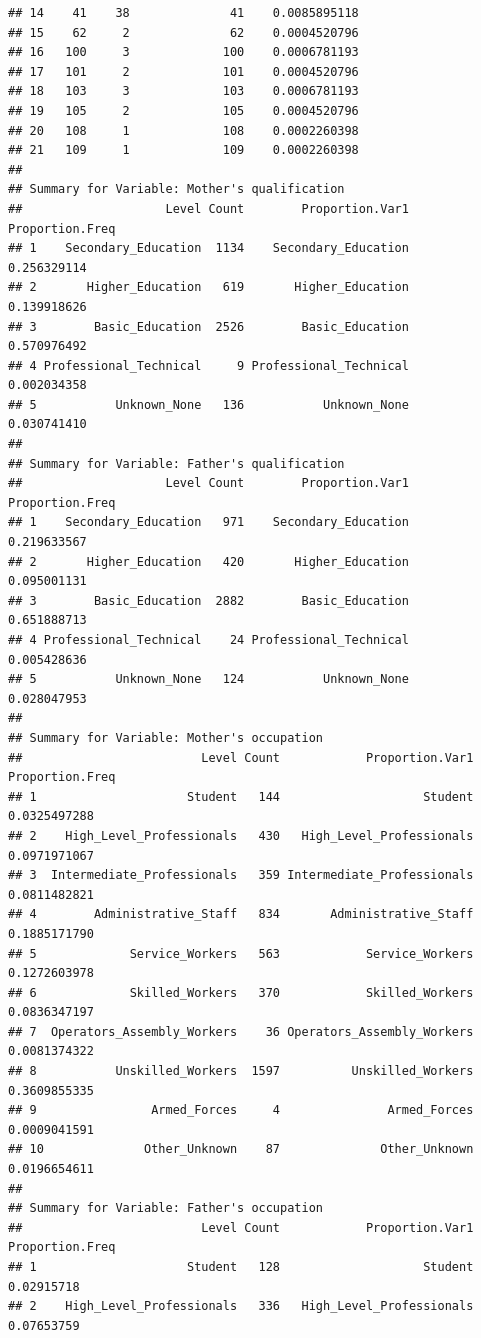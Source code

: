 \documentclass[
]{article}
\begin{document}
\begin{verbatim}
## 14    41    38              41    0.0085895118
## 15    62     2              62    0.0004520796
## 16   100     3             100    0.0006781193
## 17   101     2             101    0.0004520796
## 18   103     3             103    0.0006781193
## 19   105     2             105    0.0004520796
## 20   108     1             108    0.0002260398
## 21   109     1             109    0.0002260398
## 
## Summary for Variable: Mother's qualification 
##                    Level Count        Proportion.Var1 Proportion.Freq
## 1    Secondary_Education  1134    Secondary_Education     0.256329114
## 2       Higher_Education   619       Higher_Education     0.139918626
## 3        Basic_Education  2526        Basic_Education     0.570976492
## 4 Professional_Technical     9 Professional_Technical     0.002034358
## 5           Unknown_None   136           Unknown_None     0.030741410
## 
## Summary for Variable: Father's qualification 
##                    Level Count        Proportion.Var1 Proportion.Freq
## 1    Secondary_Education   971    Secondary_Education     0.219633567
## 2       Higher_Education   420       Higher_Education     0.095001131
## 3        Basic_Education  2882        Basic_Education     0.651888713
## 4 Professional_Technical    24 Professional_Technical     0.005428636
## 5           Unknown_None   124           Unknown_None     0.028047953
## 
## Summary for Variable: Mother's occupation 
##                         Level Count            Proportion.Var1 Proportion.Freq
## 1                     Student   144                    Student    0.0325497288
## 2    High_Level_Professionals   430   High_Level_Professionals    0.0971971067
## 3  Intermediate_Professionals   359 Intermediate_Professionals    0.0811482821
## 4        Administrative_Staff   834       Administrative_Staff    0.1885171790
## 5             Service_Workers   563            Service_Workers    0.1272603978
## 6             Skilled_Workers   370            Skilled_Workers    0.0836347197
## 7  Operators_Assembly_Workers    36 Operators_Assembly_Workers    0.0081374322
## 8           Unskilled_Workers  1597          Unskilled_Workers    0.3609855335
## 9                Armed_Forces     4               Armed_Forces    0.0009041591
## 10              Other_Unknown    87              Other_Unknown    0.0196654611
## 
## Summary for Variable: Father's occupation 
##                         Level Count            Proportion.Var1 Proportion.Freq
## 1                     Student   128                    Student      0.02915718
## 2    High_Level_Professionals   336   High_Level_Professionals      0.07653759

\end{verbatim}
\end{document}
